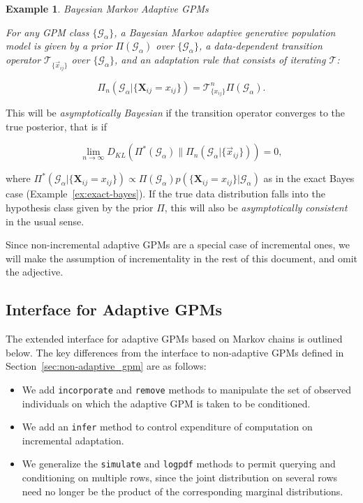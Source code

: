 \documentclass[10pt,letterpaper]{article}
\newtheorem{example}{Example}[section]
\newcommand{\set}[1]{\{#1\}}
\newcommand{\G}{\mathcal{G}}
\newcommand{\T}{\mathcal{T}}
\begin{document}
\begin{example} Bayesian Markov Adaptive GPMs

For any GPM class $\{\G_\alpha\}$, a \emph{Bayesian Markov adaptive
  generative population model} is given by a prior
$\Pi(\G_\alpha)$ over
$\{\G_\alpha\}$, a data-dependent transition operator
$\T_{\{\vec{x}_{ij}\}}$ over $\{\G_\alpha\}$, and
an adaptation rule that consists of iterating $\T$:

\[ \Pi_n(\G_\alpha|\set{\mathbf{X}_{ij} = x_{ij}}) = \T_{\set{x_{ij}}}^n 
\Pi(\G_\alpha). \]
\label{ex:markov-bayes}
\end{example}

This will be \emph{asymptotically Bayesian} if the transition operator
converges to the true posterior, that is if

\[ \lim_{n\to\infty}D_{KL}(\Pi^*(\G_\alpha) \| \Pi_n(\G_\alpha|\{\vec{x}_{ij}\})) = 0, \]

where $\Pi^*(\G_\alpha|\set{\mathbf{X}_{ij}=x_{ij}}) \propto 
\Pi(\G_\alpha) p(\set{\mathbf{X}_{ij}=x_{ij}}|\G_\alpha)$
as in the exact Bayes case (Example~\ref{ex:exact-bayes}).
If the true data distribution falls into the hypothesis class given by
the prior $\Pi$, this will also be \emph{asymptotically consistent} in
the usual sense.

Since non-incremental adaptive GPMs are a special case of incremental
ones, we will make the assumption of incrementality in the rest of
this document, and omit the adjective.

\subsection{Interface for Adaptive GPMs}
\label{sec:adaptive_gpm}

The extended interface for adaptive GPMs based on Markov chains is outlined
below.  The key differences from the interface to non-adaptive GPMs
defined in Section~\ref{sec:non-adaptive_gpm} are as follows:

\begin{itemize}
\item We add \texttt{incorporate} and \texttt{remove} methods to
  manipulate the set of observed individuals on which the adaptive GPM
  is taken to be conditioned.
\item We add an \texttt{infer} method to control expenditure of
  computation on incremental adaptation.
\item We generalize the \texttt{simulate} and \texttt{logpdf} methods
  to permit querying and conditioning on multiple rows, since the
  joint distribution on several rows need no longer be the product of
  the corresponding marginal distributions.
\end{itemize}
\end{document}

